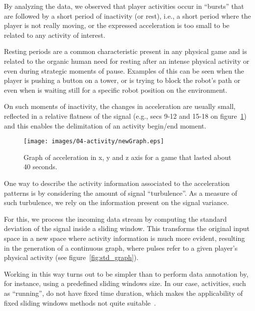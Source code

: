 By analyzing the data, we observed that player activities occur in ``bursts'' that are followed by a short period of inactivity (or rest), i.e., a short period where the player is not really moving, or the expressed acceleration is too small to be related to any activity of interest.

Resting periods are a common characteristic present in any physical game and is related to the organic human need for resting after an intense physical activity or even during strategic moments of pause. Examples of this can be seen when the player is pushing a button on a tower, or is trying to block the robot's path or even when is waiting still for a specific robot position on the environment.

On such moments of inactivity, the changes in acceleration are usually small, reflected in a relative flatness of the signal (e.g., secs 9-12 and 15-18 on figure~\ref{acc_graph}) and this enables the delimitation of an activity begin/end moment.

\begin{figure}[h!]
      \centering
      \texttt{[image: images/04-activity/newGraph.eps]}
      \caption{Graph of acceleration in x, y and z axis for a game that lasted about 40 seconds.}
      \label{acc_graph}
\end{figure}

One way to describe the activity information associated to the acceleration patterns is by considering the amount of signal ``turbulence''. As a measure of such turbulence, we rely on the information present on the signal variance. 

For this, we process the incoming data stream by computing the standard deviation of the signal inside a sliding window. This transforms the original input space in a new space where activity information is much more evident, resulting in the generation of a continuous graph, where pulses refer to a given player's physical activity (see figure~\ref{fig:std_graph}). %

Working in this way turns out to be simpler than to perform data annotation by, for instance, using a predefined sliding windows size. In our case, activities, such as ``running'', do not have fixed time duration, which makes the applicability of fixed sliding windows methods not quite suitable~\cite{noor_adaptive_2016}.

